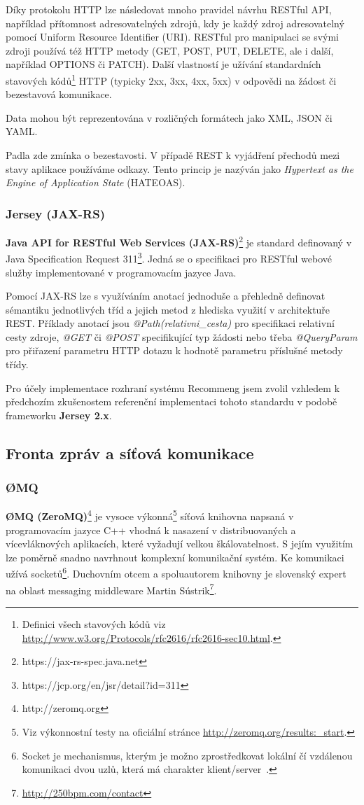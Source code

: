 \documentclass[thesis=M,czech]{FITthesis}[2014/05/07]
\begin{document}
Díky protokolu HTTP lze následovat mnoho pravidel návrhu RESTful API, například přítomnost adresovatelných zdrojů, kdy je každý zdroj adresovatelný pomocí Uniform Resource Identifier (URI). RESTful pro manipulaci se svými zdroji používá též HTTP metody (GET, POST, PUT, DELETE, ale i další, například OPTIONS či PATCH). Další vlastností je užívání standardních stavových kódů\footnote{Definici všech stavových kódů viz \url{http://www.w3.org/Protocols/rfc2616/rfc2616-sec10.html}.} HTTP (typicky 2xx, 3xx, 4xx, 5xx) v odpovědi na žádost či bezestavová komunikace.

Data mohou být reprezentována v rozličných formátech jako XML, JSON či YAML.

Padla zde zmínka o bezestavosti. V případě REST k vyjádření přechodů mezi stavy aplikace používáme odkazy. Tento princip je nazýván jako \emph{Hypertext as the Engine of Application State} (HATEOAS). 

\subsubsection{Jersey (JAX-RS)}
\textbf{Java API for RESTful Web Services (JAX-RS)}\footnote{https://jax-rs-spec.java.net} je standard definovaný v Java Specification Request 311\footnote{https://jcp.org/en/jsr/detail?id=311}. Jedná se o specifikaci pro RESTful webové služby implementované v programovacím jazyce Java.

Pomocí JAX-RS lze s využíváním anotací jednoduše a přehledně definovat sémantiku jednotlivých tříd a jejich metod z hlediska využití v architektuře REST. Příklady anotací jsou \emph{@Path(relativni\_cesta)} pro specifikaci relativní cesty zdroje, \emph{@GET} či \emph{@POST} specifikující typ žádosti nebo třeba \emph{@QueryParam} pro přiřazení parametru HTTP dotazu k hodnotě parametru příslušné metody třídy.

Pro účely implementace rozhraní systému Recommeng jsem zvolil vzhledem k předchozím zkušenostem referenční implementaci tohoto standardu v podobě frameworku \textbf{Jersey 2.x}. 

\subsection{Fronta zpráv a síťová komunikace}

\subsubsection{ØMQ}
\textbf{ØMQ (ZeroMQ)}\footnote{http://zeromq.org} je vysoce výkonná\footnote{Viz výkonnostní testy na oficiální stránce \url{http://zeromq.org/results:_start}.} síťová knihovna napsaná v programovacím jazyce C++ vhodná k nasazení v distribuovaných a vícevláknových aplikacích, které vyžadují velkou škálovatelnost. S jejím využitím lze poměrně snadno navrhnout komplexní komunikační systém. Ke komunikaci užívá socketů\footnote{Socket je mechanismus, kterým je možno zprostředkovat lokální čí vzdálenou komunikaci dvou uzlů, která má charakter klient/server~\cite{socket}.}. Duchovním otcem a spoluautorem knihovny je slovenský expert na oblast messaging middleware Martin Sústrik\footnote{\url{http://250bpm.com/contact}}.
\end{document}
